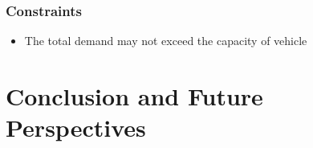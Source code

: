 \documentclass[10pt]{article}
\begin{document}
\subsubsection*{Constraints}

\begin{itemize}
\item The total demand may not exceed the capacity of vehicle
\end{itemize}










\section{Conclusion and Future Perspectives}
\label{sec:concl}

\blindtext






\end{document}
